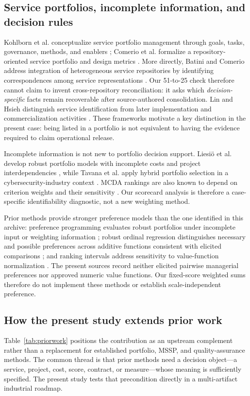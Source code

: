 \documentclass[systems,article,submit,moreauthors]{Definitions/mdpi}
\begin{document}
\subsection{Service portfolios, incomplete information, and decision rules}
Kohlborn et al. conceptualize service portfolio management through goals, tasks, governance, methods, and enablers \cite{Kohlborn2009}; Comerio et al. formalize a repository-oriented service portfolio and design metrics \cite{Comerio2015}. More directly, Batini and Comerio address integration of heterogeneous service repositories by identifying correspondences among service representations \cite{BatiniComerio2016}. Our 51-to-25 check therefore cannot claim to invent cross-repository reconciliation: it asks which \emph{decision-specific} facts remain recoverable after source-authored consolidation. Lin and Hsieh distinguish service identification from later implementation and commercialization activities \cite{LinHsieh2011}. These frameworks motivate a key distinction in the present case: being listed in a portfolio is not equivalent to having the evidence required to claim operational release.

Incomplete information is not new to portfolio decision support. Liesi\"o et al. develop robust portfolio models with incomplete costs and project interdependencies \cite{Liesio2008}, while Tavana et al. apply hybrid portfolio selection in a cybersecurity-industry context \cite{Tavana2019}. MCDA rankings are also known to depend on criterion weights and their sensitivity \cite{Maliene2018}. Our scorecard analysis is therefore a case-specific identifiability diagnostic, not a new weighting method.

Prior methods provide stronger preference models than the one identified in this archive: preference programming evaluates robust portfolios under incomplete input or weighting information \cite{LiesioMildSalo2007}; robust ordinal regression distinguishes necessary and possible preferences across additive functions consistent with elicited comparisons \cite{Greco2008}; and ranking intervals address sensitivity to value-function normalization \cite{PunkkaSalo2014}. The present sources record neither elicited pairwise managerial preferences nor approved numeric value functions. Our fixed-score weighted sums therefore do not implement these methods or establish scale-independent preference.


\subsection{How the present study extends prior work}
Table~\ref{tab:priorwork} positions the contribution as an upstream complement rather than a replacement for established portfolio, MSSP, and quality-assurance methods. The common thread is that prior methods need a decision object---a service, project, cost, score, contract, or measure---whose meaning is sufficiently specified. The present study tests that precondition directly in a multi-artifact industrial roadmap.
\end{document}
